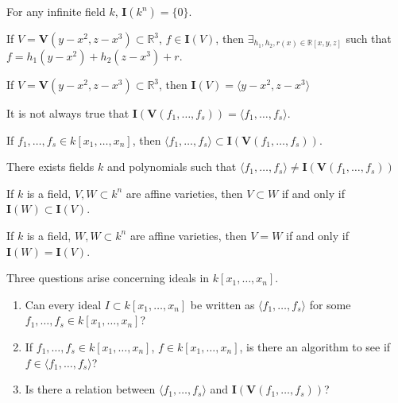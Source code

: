                 \begin{theorem}
                    For any infinite field $k$,
                    $\mathbf{I}(k^n)=\{0\}$.
                \end{theorem}
                \begin{theorem}
                    If $V=\mathbf{V}(y-x^2,z-x^3)\subset\mathbb{R}^3$,
                    $f\in \mathbf{I}(V)$,
                    then $\exists_{h_1,h_2,r(x)\in\mathbb{R}[x,y,z]}$
                    such that $f=h_1(y-x^2)+h_2(z-x^3)+r$.
                \end{theorem}
                \begin{theorem}
                    If $V=\mathbf{V}(y-x^2,z-x^3)\subset\mathbb{R}^3$,
                    then $\mathbf{I}(V)=\langle y-x^2,z-x^3\rangle$
                \end{theorem}
                It is not always true that
                $\mathbf{I}(\mathbf{V}(f_1,\hdots, f_s))%
                 =\langle f_1,\hdots, f_s\rangle$.
                \begin{theorem}
                    If $f_1,\hdots, f_s \in k[x_1,\hdots ,x_n]$, then
                    $\langle f_1,\hdots,f_s\rangle%
                     \subset\mathbf{I}(\mathbf{V}(f_1,\hdots, f_s))$.
                \end{theorem}
                \begin{theorem}
                    There exists fields $k$ and polynomials
                    such that
                    $\langle f_1,\hdots,f_s\rangle%
                     \ne\mathbf{I}(\mathbf{V}(f_1,\hdots, f_s))$
                \end{theorem}
                \begin{theorem}
                    If $k$ is a field, $V,W\subset k^n$ are affine
                    varieties, then $V\subset W$ if and only if
                    $\mathbf{I}(W)\subset \mathbf{I}(V)$.
                \end{theorem}
                \begin{theorem}
                    If $k$ is a field, $W,W\subset k^n$ are
                    affine varieties, then $V=W$ if
                    and only if $\mathbf{I}(W)=\mathbf{I}(V)$.
                \end{theorem}
                Three questions arise concerning
                ideals in $k[x_1,\hdots ,x_n]$.
                \begin{enumerate}
                    \item Can every ideal $I\subset k[x_1,\hdots ,x_n]$
                          be written as $\langle f_1,\hdots, f_s\rangle$
                          for some $f_1,\hdots, f_s \in k[x_1,\hdots ,x_n]$?
                    \item If $f_1,\hdots, f_s\in k[x_1,\hdots ,x_n]$,
                          $f\in k[x_1,\hdots ,x_n]$, is there an
                          algorithm to see if $f\in\langle f_{1},\hdots,f_{s}\rangle$?
                    \item Is there a relation between
                          $\langle f_1,\hdots, f_s\rangle$ and
                          $\mathbf{I}(\mathbf{V}(f_1,\hdots, f_s))$?
                \end{enumerate}
